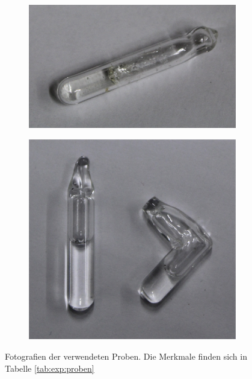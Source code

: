 \begin{figure}[H]
\begin{subfigure}{.24\textwidth}
		\caption{ }
		\label{fig:exp:probe_b}
	\end{subfigure}
	\begin{subfigure}{.24\textwidth}
		\centering
		\includegraphics[width=\textwidth]{graphics/proben/CRN neu.jpg}
		\caption{ }
		\label{fig:exp:probe_c}
	\end{subfigure}
	\begin{subfigure}{.24\textwidth}
		\centering
		\includegraphics[width=\textwidth]{graphics/proben/RbCl in D20.jpg}
		\caption{ }
		\label{fig:exp:probe_d}
	\end{subfigure}
	\caption{Fotografien der verwendeten Proben. Die Merkmale finden sich in Tabelle \ref{tab:exp:proben}}
	\label{fig:exp:proben}
\end{figure}

